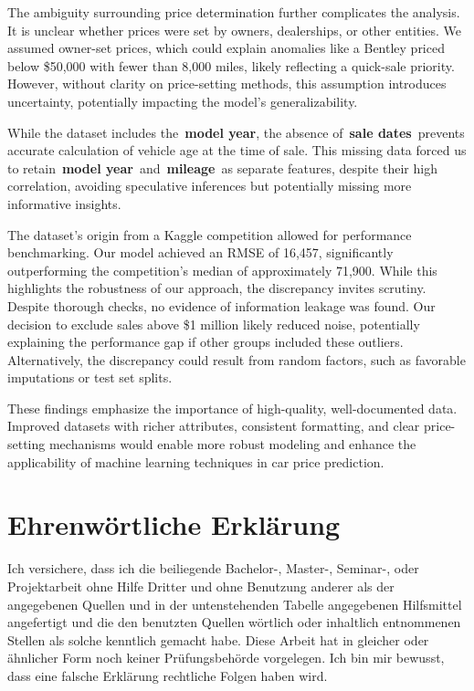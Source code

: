 \documentclass[a4paper,oneside,bibliography=totoc]{scrbook}
\begin{document}
The ambiguity surrounding price determination further complicates the analysis. It is unclear whether prices were set by owners, dealerships, or other entities. We assumed owner-set prices, which could explain anomalies like a Bentley priced below \$50,000 with fewer than 8,000 miles, likely reflecting a quick-sale priority. However, without clarity on price-setting methods, this assumption introduces uncertainty, potentially impacting the model's generalizability.

While the dataset includes the~\textbf{model year}, the absence of~\textbf{sale dates}~prevents accurate calculation of vehicle age at the time of sale. This missing data forced us to retain~\textbf{model year}~and~\textbf{mileage}~as separate features, despite their high correlation, avoiding speculative inferences but potentially missing more informative insights.

The dataset's origin from a Kaggle competition allowed for performance benchmarking. Our model achieved an RMSE of 16,457, significantly outperforming the competition's median of approximately 71,900. While this highlights the robustness of our approach, the discrepancy invites scrutiny. Despite thorough checks, no evidence of information leakage was found. Our decision to exclude sales above \$1 million likely reduced noise, potentially explaining the performance gap if other groups included these outliers. Alternatively, the discrepancy could result from random factors, such as favorable imputations or test set splits.

These findings emphasize the importance of high-quality, well-documented data. Improved datasets with richer attributes, consistent formatting, and clear price-setting mechanisms would enable more robust modeling and enhance the applicability of machine learning techniques in car price prediction.

\backmatter


\label{bibliography}

\chapter{Ehrenwörtliche Erklärung}
\label{cha:ehrenwoertlicheErklaerung}

Ich versichere, dass ich die beiliegende Bachelor-, Master-, Seminar-, oder
Projektarbeit ohne Hilfe Dritter und ohne Benutzung anderer als der angegebenen
Quellen und in der untenstehenden Tabelle angegebenen Hilfsmittel angefertigt
und die den benutzten Quellen wörtlich oder inhaltlich entnommenen Stellen als
solche kenntlich gemacht habe. Diese Arbeit hat in gleicher oder ähnlicher Form
noch keiner Prüfungsbehörde vorgelegen. Ich bin mir bewusst, dass eine falsche
Erklärung rechtliche Folgen haben wird.
\end{document}
